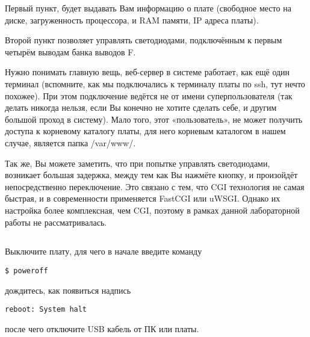 Первый пункт, будет выдавать Вам информацию о плате (свободное место на диске, загруженность процессора, и RAM памяти, IP адреса платы).

Второй пункт позволяет управлять светодиодами, подключённым к первым четырём выводам банка выводов F.

Нужно понимать главную вещь, веб-сервер в системе работает, как ещё один терминал (вспомните, как мы подключались к терминалу платы по ssh, тут нечто похожее). При этом подключение ведётся не от имени суперпользователя (так делать никогда нельзя, если Вы конечно не хотите сделать себе, и другим большой проход в систему). Мало того, этот «пользователь», не может получить доступа к корневому каталогу платы, для него корневым каталогом в нашем случае, является папка /var/www/.

Так же, Вы можете заметить, что при попытке управлять светодиодами, возникает большая задержка, между тем как Вы нажмёте кнопку, и произойдёт непосредственно переключение. Это связано с тем, что CGI технология не самая быстрая, и в современности применяется FastCGI или uWSGI. Однако их настройка более комплексная, чем CGI, поэтому в рамках данной лабораторной работы не рассматривалась.   

\subsection{} Выключите плату, для чего в начале введите команду
\begin{lstlisting}[style=bash]
	$ poweroff
\end{lstlisting}
дождитесь, как появиться надпись
\begin{lstlisting}[style=stdout]
	reboot: System halt
\end{lstlisting}
после чего отключите USB кабель от ПК или платы. 